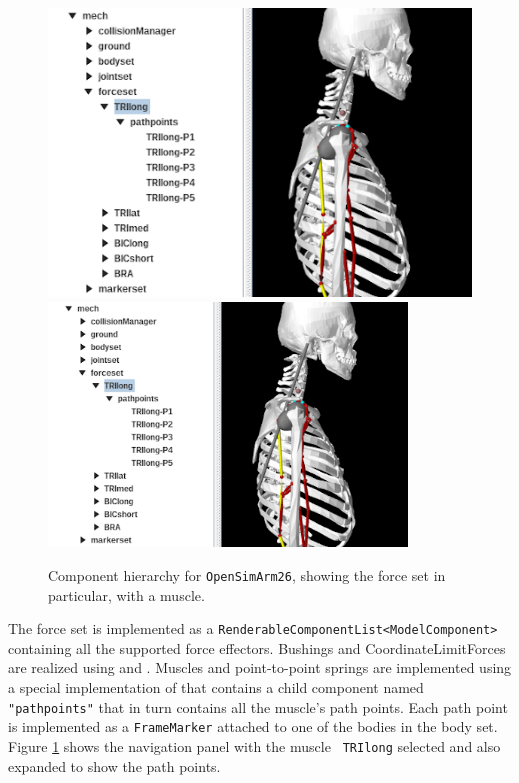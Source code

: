 \begin{figure}[ht]
\begin{center}
   \iflatexml 
      \includegraphics[]{images/Arm26Hierarchy2} 
   \else 
      \includegraphics[width=3.75in]{images/Arm26Hierarchy2} \fi
\end{center}
\caption{Component hierarchy for {\tt OpenSimArm26}, showing the force set in
particular, with a muscle.}
\label{Arm26Hierarchy2:fig}
\end{figure}

The force set is implemented as a {\tt RenderableComponentList<ModelComponent>}
containing all the supported force effectors. Bushings and
CoordinateLimitForces are realized using  and
. Muscles and point-to-point springs are
implemented using a special implementation of
 that contains a child
component named {\tt "pathpoints"} that in turn contains all the muscle's path
points. Each path point is implemented as a {\tt FrameMarker} attached to one
of the bodies in the body set. Figure
\ref{Arm26Hierarchy2:fig} shows the navigation panel with the muscle {\tt
TRIlong} selected and also expanded to show the path points.

